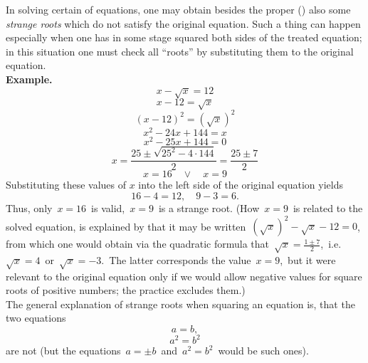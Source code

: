\documentclass[12pt]{article}
\theoremstyle{definition}
\begin{document}
 

In solving certain  of equations, one may obtain besides the proper ()  also some {\em strange roots} which do not satisfy the original equation.  Such a thing can happen especially when one has in some stage squared both sides of the treated equation; in this situation one must check all ``roots'' by substituting them to the original equation.\\

\textbf{Example.}\, $$x-\sqrt{x} = 12$$
$$x-12 = \sqrt{x}$$
$$(x-12)^2 = (\sqrt{x})^2$$
$$x^2-24x+144 = x$$
$$x^2-25x+144 = 0$$
$$x = \frac{25\pm\sqrt{25^2-4\cdot144}}{2} = \frac{25\pm7}{2}$$
$$x = 16 \quad \lor \quad x = 9$$
Substituting these values of $x$ into the left side of the original equation yields
$$16-4 = 12, \quad 9-3 = 6.$$
Thus, only\, $x = 16$\, is valid,\, $x = 9$\, is a strange root.  (How\, $x = 9$\, is related to the solved equation, is explained by that it may be written\, $(\sqrt{x})^2-\sqrt{x}-12 = 0$, from which one would obtain via the quadratic formula that\, $\sqrt{x} = \frac{1\pm7}{2}$,\, i.e.\, $\sqrt{x} = 4$\, or\, $\sqrt{x} = -3$.\, The latter corresponds the value\, $x = 9$,\, but it were relevant to the original equation only if we would allow negative values for square roots of positive numbers; the  practice excludes them.)\\


The general explanation of strange roots when squaring an equation is, that the two equations
$$a = b,$$
$$a^2 = b^2$$
are not  (but the equations\, $a = \pm b$\, and\, $a^2 = b^2$\, would be such ones).



\end{document}
